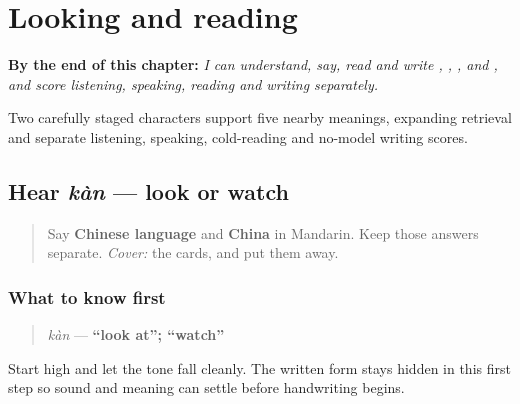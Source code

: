 
\chapter{Looking and reading}
\label{ch:zh-looking-reading}

\begin{chapteropening}
\textbf{By the end of this chapter:} \emph{I can understand, say, read and write , , ,  and , and score listening, speaking, reading and writing separately.}

Two carefully staged characters support five nearby meanings, expanding retrieval and separate listening, speaking, cold-reading and no-model writing scores.
\end{chapteropening}

\section[kàn]{Hear \emph{kàn} — look or watch}

\label{lesson:ZH-C18-hear-kan}



\begin{quote}
Say \textbf{Chinese language} and \textbf{China} in Mandarin. Keep those answers separate. \emph{Cover:} the cards, and put them away.
\end{quote}

\subsection*{What to know first}
\begin{quote}
\emph{kàn} — \textbf{\textquotedblleft{}look at\textquotedblright{}; \textquotedblleft{}watch\textquotedblright{}}
\end{quote}

Start high and let the tone fall cleanly. The written form stays hidden in this first step so sound and meaning can settle before handwriting begins.


